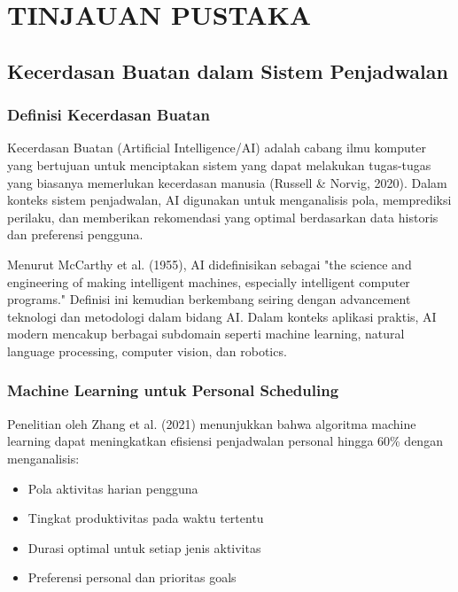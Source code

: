 \chapter{TINJAUAN PUSTAKA}
\thispagestyle{plain}

\section{Kecerdasan Buatan dalam Sistem Penjadwalan}

\subsection{Definisi Kecerdasan Buatan}

Kecerdasan Buatan (Artificial Intelligence/AI) adalah cabang ilmu komputer yang bertujuan untuk menciptakan sistem yang dapat melakukan tugas-tugas yang biasanya memerlukan kecerdasan manusia (Russell \& Norvig, 2020). Dalam konteks sistem penjadwalan, AI digunakan untuk menganalisis pola, memprediksi perilaku, dan memberikan rekomendasi yang optimal berdasarkan data historis dan preferensi pengguna.

Menurut McCarthy et al. (1955), AI didefinisikan sebagai "the science and engineering of making intelligent machines, especially intelligent computer programs." Definisi ini kemudian berkembang seiring dengan advancement teknologi dan metodologi dalam bidang AI. Dalam konteks aplikasi praktis, AI modern mencakup berbagai subdomain seperti machine learning, natural language processing, computer vision, dan robotics.

\subsection{Machine Learning untuk Personal Scheduling}

Penelitian oleh Zhang et al. (2021) menunjukkan bahwa algoritma machine learning dapat meningkatkan efisiensi penjadwalan personal hingga 60\% dengan menganalisis:

\begin{itemize}
\item Pola aktivitas harian pengguna
\item Tingkat produktivitas pada waktu tertentu
\item Durasi optimal untuk setiap jenis aktivitas
\item Preferensi personal dan prioritas goals
\end{itemize}

